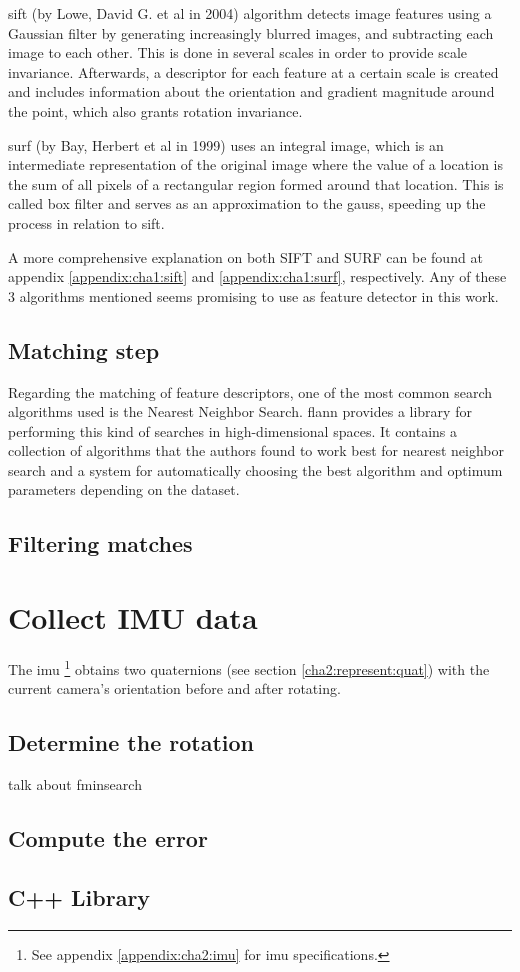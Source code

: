 \acrshort{sift} (by Lowe, David G. et al in 2004) \cite{sift} algorithm detects image features using a Gaussian filter by generating increasingly blurred images, and subtracting each image to each other. This is done in several scales in order to provide scale invariance. Afterwards, a descriptor for each feature at a certain scale is created and includes information about the orientation and gradient magnitude around the point, which also grants rotation invariance.

\acrshort{surf} (by Bay, Herbert et al in 1999) \cite{surf} uses an integral image, which is an intermediate representation of the original image where the value of a location is the sum of all pixels of a rectangular region formed around that location. This is called box filter and serves as an approximation to the \gls{gauss}, speeding up the process in relation to \acrshort{sift}.

A more comprehensive explanation on both SIFT and SURF can be found at appendix \ref{appendix:cha1:sift} and \ref{appendix:cha1:surf}, respectively. Any of these 3 algorithms mentioned seems promising to use as feature detector in this work.

\subsection{Matching step}
Regarding the matching of feature descriptors, one of the most common search algorithms used is the Nearest Neighbor Search. \acrfull{flann}  \cite{flann} provides a library for performing this kind of searches in high-dimensional spaces. It contains a collection of algorithms that the authors found to  work best for nearest neighbor search and a system for automatically choosing the best algorithm and optimum parameters depending on the dataset.

\subsection{Filtering matches}

\section{Collect IMU data}
The \acrlong{imu} \footnote{See appendix \ref{appendix:cha2:imu} for \acrshort{imu} specifications.} obtains two quaternions (see section \ref{cha2:represent:quat}) with the current camera's orientation before and after rotating.

\subsection{Determine the rotation}
talk about fminsearch

\subsection{Compute the error}

\subsection{C++ Library}


